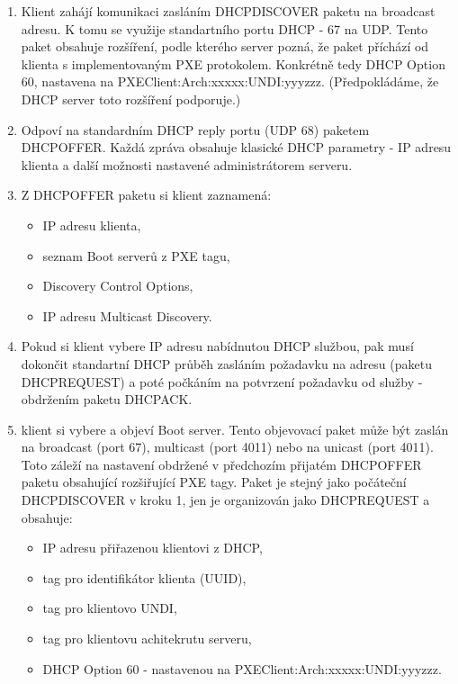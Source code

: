 \documentclass[thesis=B,czech]{FITthesis}[2012/06/26]
\begin{document}
\begin{enumerate}

\item  Klient zahájí komunikaci zasláním DHCPDISCOVER paketu na broadcast adresu. K tomu se využije standartního portu DHCP - 67 na UDP. Tento paket obsahuje rozšíření, podle kterého server pozná, že paket příchází od klienta s implementovaným PXE protokolem. Konkrétně tedy DHCP Option 60, nastavena na PXEClient:Arch:xxxxx:UNDI:yyyzzz. (Předpokládáme, že DHCP server toto rozšíření podporuje.)

\item  Odpoví na standardním DHCP reply portu (UDP 68) paketem DHCPOFFER. Každá zpráva obsahuje klasické DHCP parametry - IP adresu klienta a další možnosti nastavené administrátorem serveru.

\item Z DHCPOFFER paketu si klient zaznamená:
\begin{itemize}
\item IP adresu klienta,
\item seznam Boot serverů z PXE tagu,
\item Discovery Control Options,
\item IP adresu Multicast Discovery.

\end{itemize}

\item  Pokud si klient vybere IP adresu nabídnutou DHCP službou, pak musí dokončit standartní DHCP průběh zasláním požadavku na adresu (paketu DHCPREQUEST) a poté počkáním na potvrzení požadavku od služby - obdržením paketu DHCPACK.

\item  klient si vybere a objeví Boot server. Tento objevovací paket může být zaslán na broadcast (port 67), multicast (port 4011) nebo na unicast (port 4011). Toto záleží na nastavení obdržené v předchozím přijatém DHCPOFFER paketu obsahující rozšiřující PXE tagy. Paket je stejný jako počáteční DHCPDISCOVER v kroku 1, jen je organizován jako DHCPREQUEST a obsahuje:

\begin{itemize}
\item IP adresu přiřazenou klientovi z DHCP,
\item tag pro identifikátor klienta (UUID),
\item tag pro klientovo UNDI,
\item tag pro klientovu achitekrutu serveru,
\item DHCP Option 60 - nastavenou na PXEClient:Arch:xxxxx:UNDI:yyyzzz.
\end{itemize}


\end{enumerate}
\end{document}
